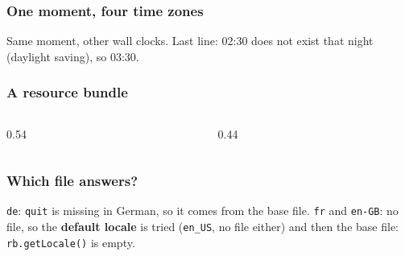 \documentclass[aspectratio=169,10pt,compress]{beamer}
\begin{document}
\begin{frame}[t,fragile] \frametitle{One moment, four time zones}

  \vspace{0.1em}
  \small Same moment, other wall clocks. Last line: 02:30 does not exist that night (daylight saving), so 03:30.
\end{frame}





\begin{frame}[t,fragile] \frametitle{A resource bundle}
  \begin{columns}[T]
    \begin{column}{0.54\textwidth}
    \end{column}
    \begin{column}{0.44\textwidth}
    \end{column}
  \end{columns}
\end{frame}




\begin{frame}[t,fragile] \frametitle{Which file answers?}

  \vspace{0.1em}
  \small
  \texttt{de}: \texttt{quit} is missing in German, so it comes from the base file. \texttt{fr} and \texttt{en-GB}:
  no file, so the \textbf{default locale} is tried (\texttt{en\_US}, no file either) and then the base file:
  \texttt{rb.getLocale()} is empty.
\end{frame}
\end{document}
